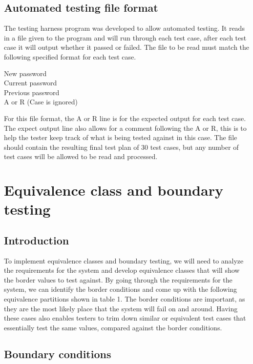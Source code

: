 \documentclass[12pt,letterpaper]{article}
\begin{document}
\subsection{Automated testing file format}

The testing harness program was developed to allow automated testing. It reads in a file given to the
program and will run through each test case, after each test case it will output whether it
passed or failed. The file to be read must match the following specified format for each test case.

\begin{center}
New password \\
Current password \\
Previous password \\
A or R (Case is ignored)
\end{center}

For this file format, the A or R line is for the expected output for each test case. The expect output
line also allows for a comment following the A or R, this is to help the tester keep track of
what is being tested against in this case. The file should contain the resulting final
test plan of 30 test cases, but any number of test cases will be allowed to be
read and processed.

\section{Equivalence class and boundary testing}

\subsection{Introduction}
To implement equivalence classes and boundary testing, we will need to analyze the requirements
for the system and develop equivalence classes that will show the border values to test against.
By going through the requirements for the system, we can identify the border conditions and
come up with the following equivalence partitions shown in table 1. The border conditions are important,
as they are the most likely place that the system will fail on and around.  Having these
cases also enables testers to trim down similar or equivalent test cases that essentially
test the same values, compared against the border conditions.

\subsection{Boundary conditions}
\end{document}
